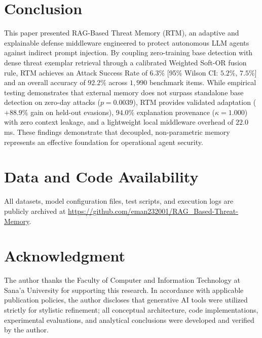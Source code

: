 \documentclass[conference]{IEEEtran}
\begin{document}
\section{Conclusion}
This paper presented RAG-Based Threat Memory (RTM), an adaptive and explainable defense middleware engineered to protect autonomous LLM agents against indirect prompt injection. By coupling zero-training base detection with dense threat exemplar retrieval through a calibrated Weighted Soft-OR fusion rule, RTM achieves an Attack Success Rate of $6.3\%$ [95\% Wilson CI: $5.2\%$, $7.5\%$] and an overall accuracy of $92.2\%$ across $1,990$ benchmark items. While empirical testing demonstrates that external memory does not surpass standalone base detection on zero-day attacks ($p = 0.0039$), RTM provides validated adaptation ($+88.9\%$ gain on held-out evasions), $94.0\%$ explanation provenance ($\kappa = 1.000$) with zero context leakage, and a lightweight local middleware overhead of $22.0$\,ms. These findings demonstrate that decoupled, non-parametric memory represents an effective foundation for operational agent security.

\section*{Data and Code Availability}
All datasets, model configuration files, test scripts, and execution logs are publicly archived at \url{https://github.com/eman232001/RAG_Based-Threat-Memory}.

\section*{Acknowledgment}
The author thanks the Faculty of Computer and Information Technology at Sana'a University for supporting this research. In accordance with applicable publication policies, the author discloses that generative AI tools were utilized strictly for stylistic refinement; all conceptual architecture, code implementations, experimental evaluations, and analytical conclusions were developed and verified by the author.
\end{document}

